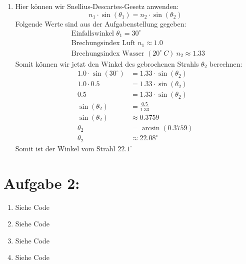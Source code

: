 \documentclass[11pt]{article}
\begin{document}
\begin{enumerate}
\textbf{\underline{Diffus:}}\\ Nein, die diffuse Reflexion hängt nur vom Winkel zwischen dem Lichtvektor $L$ und der Oberflächennormalen $N$ ab ($N \cdot L$). Der Betrachter sieht nämlich die Oberfläche aus jeder Richtung gleich hell. \\\\
\textbf{\underline{Spekular:}}\\ Ja, das Glanzlicht ist nur sichtbar, wenn der Betrachter (Vektor $V$) in den Reflexionskegel des Lichts blickt. Die Formel enthält das Skalarprodukt aus Reflexionsvektor $R$ und Blickvektor $V$ ($(R \cdot V)^n$), wobei der Exponent $n$ bestimmt, wie stark etwas poliert ist. Bewegt sich der Betrachter, wandert das Glanzlicht mit
  \item Hier können wir Snellius-Descartes-Gesetz anwenden:
\begin{equation}
n_1 \cdot \sin(\theta_1) = n_2 \cdot \sin(\theta_2)
\end{equation}
Folgende Werte sind aus der Aufgabenstellung gegeben:
\begin{align*}
&\text{Einfallswinkel } \theta_1 = 30^{\circ}\\
&\text{Brechungsindex Luft } n_1 \approx 1.0\\
&\text{Brechungsindex Wasser } (20^{\circ}~C)~n_2 \approx 1.33
\end{align*}
Somit können wir jetzt den Winkel des gebrochenen Strahls $\theta_2$ berechnen:
\begin{align*}
1.0 \cdot \sin(30^{\circ}) &= 1.33 \cdot \sin(\theta_2) \\
1.0 \cdot 0.5 &= 1.33 \cdot \sin(\theta_2) \\
0.5 &= 1.33 \cdot \sin(\theta_2) \\
\sin(\theta_2) &= \frac{0.5}{1.33} \\
\sin(\theta_2) &\approx 0.3759 \\
\theta_2 &= \arcsin(0.3759) \\
\theta_2 &\approx 22.08^{\circ}
\end{align*}
Somit ist der Winkel vom Strahl ${22.1^{\circ}}$ 
\end{enumerate}
\section*{Aufgabe 2:}
\begin{enumerate}
  \item Siehe Code
  \item Siehe Code
  \item Siehe Code
  \item Siehe Code
\end{enumerate}
\end{document}
